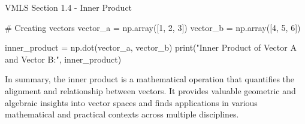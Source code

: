 \begin{notes}{VMLS Section 1.4 - Inner Product}
\begin{highlight}
\begin{code}[Python]
    # Creating vectors
    vector_a = np.array([1, 2, 3])
    vector_b = np.array([4, 5, 6])
    
    inner_product = np.dot(vector_a, vector_b)
    print("Inner Product of Vector A and Vector B:", inner_product)            
    \end{code}
    \end{highlight}

    In summary, the inner product is a mathematical operation that quantifies the alignment and relationship between vectors. It provides valuable geometric and algebraic insights into vector spaces and finds applications 
    in various mathematical and practical contexts across multiple disciplines.
\end{notes}